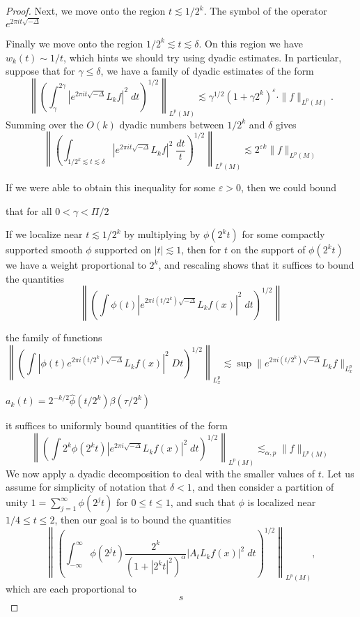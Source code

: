 \begin{proof}
    Next, we move onto the region $t \lesssim 1/2^k$. The symbol of the operator $e^{2 \pi i t \sqrt{-\Delta}}$

    Finally we move onto the region $1/2^k \lesssim t \lesssim \delta$. On this region we have $w_k(t) \sim 1/t$, which hints we should try using dyadic estimates. In particular, suppose that for $\gamma \leq \delta$, we have a family of dyadic estimates of the form
    \[ \left\| \left( \int_\gamma^{2\gamma} |e^{2 \pi i t \sqrt{-\Delta}} L_k f|^2\; dt \right)^{1/2} \right\|_{L^p(M)} \lesssim \gamma^{1/2} (1 + \gamma 2^k)^\varepsilon \cdot \| f \|_{L^p(M)}. \]
    Summing over the $O(k)$ dyadic numbers between $1/2^k$ and $\delta$ gives
    \[ \left\| \left( \int_{1/2^k \lesssim t \lesssim \delta} |e^{2 \pi i t \sqrt{-\Delta}} L_k f|^2\; \frac{dt}{t} \right)^{1/2} \right\|_{L^p(M)} \lesssim 2^{\varepsilon k} \| f \|_{L^p(M)} \]






    If we were able to obtain this inequality for some $\varepsilon > 0$, then we could bound


     that for all $0 < \gamma < \Pi/2$


    If we localize near $t \lesssim 1/2^k$ by multiplying by $\phi(2^k t)$ for some compactly supported smooth $\phi$ supported on $|t| \lesssim 1$, then for $t$ on the support of $\phi(2^k t)$ we have a weight proportional to $2^k$, and rescaling shows that it suffices to bound the quantities
    \[ \left\| \left( \int \phi(t) |e^{2 \pi i (t/2^k) \sqrt{-\Delta}} L_k f(x)|^2\; dt \right)^{1/2} \right\| \]

     the family of functions
    \[ \left\| \left( \int |\phi(t) e^{2 \pi i (t / 2^k) \sqrt{-\Delta}} L_k f(x)|^2\; Dt \right)^{1/2} \right\|_{L^p_x} \lesssim \sup \| e^{2 \pi i (t / 2^k) \sqrt{-\Delta}} L_k f \|_{L^p_x} \]


    $a_k(t) = 2^{-k/2} \widehat{\phi}(t/2^k) \beta(\tau/2^k)$

    it suffices to uniformly bound quantities of the form
    \[ \left\| \left( \int 2^k \phi(2^k t) |e^{2 \pi i \sqrt{-\Delta}} L_k f(x)|^2\; dt \right)^{1/2} \right\|_{L^p(M)} \lesssim_{\alpha,p} \| f \|_{L^p(M)} \]
    We now apply a dyadic decomposition to deal with the smaller values of $t$. Let us assume for simplicity of notation that $\delta < 1$, and then consider a partition of unity $1 = \sum_{j = 1}^\infty \phi(2^j t)$ for $0 \leq t \leq 1$, and such that $\phi$ is localized near $1/4 \leq t \leq 2$, then our goal is to bound the quantities
    \[ \left\| \left( \int_{-\infty}^\infty \phi(2^j t) \frac{2^k}{(1 + |2^k t|^2)^\alpha} |A_t L_k f(x)|^2\; dt \right)^{1/2} \right\|_{L^p(M)}, \]
    which are each proportional to
    \[ s \]
\end{proof}







